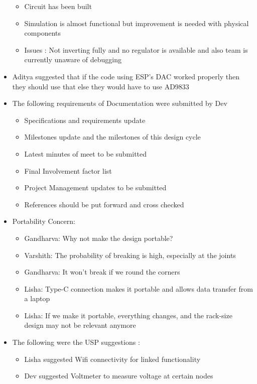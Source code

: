 \documentclass[12pt,a4paper]{article}
\begin{document}
\begin{itemize}
    \begin{itemize}
        \item Circuit has been built
        \item Simulation is almost functional but improvement is needed with physical components
        \item Issues : Not inverting fully and no regulator is available and also team is currently unaware of debugging
    \end{itemize}
    \item Aditya suggested that if the code using ESP's DAC worked properly then they should use that else they would have to use AD9833
    \item The following requirements of Documentation were submitted by Dev
    \begin{itemize}
        \item Specifications and requirements update
        \item Milestones update and the milestones of this design cycle
        \item Latest minutes of meet to be submitted
        \item Final Involvement factor list
        \item Project Management updates to be submitted
        \item References should be put forward and cross checked
    \end{itemize}
    \item Portability Concern:
    \begin{itemize}
        \item Gandharva: Why not make the design portable?
        \item Varshith: The probability of breaking is high, especially at the joints
        \item Gandharva: It won’t break if we round the corners
        \item Lisha: Type-C connection makes it portable and allows data transfer from a laptop
        \item Lisha: If we make it portable, everything changes, and the rack-size design may not be relevant anymore
    \end{itemize}
    \item The following were the USP suggestions :
    \begin{itemize}
        \item Lisha suggested Wifi connectivity for linked functionality
        \item Dev suggested Voltmeter to measure voltage at certain nodes

\end{itemize}
\end{itemize}
\end{document}

